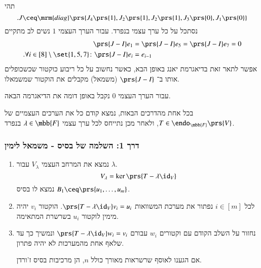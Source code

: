 \documentclass[a4paper,10pt,oneside,openany]{article}
\newcommand{\heart}{\ensuremath\varheartsuit}
\begin{document}
\begin{example}
תהי
\[\text{.} J \ceq \mrm{diag}\prs{J_4\prs{1}, J_2\prs{1}, J_2\prs{1}, J_3\prs{0}, J_1\prs{0}}\]
נסתכל על כל ערך עצמי בנפרד.
עבור הערך העצמי
$1$
נשים לב מתקיים
\begin{align*}
\prs{J-I} e_1 &= \prs{J-I} e_5 = \prs{J-I} e_7 = 0 \\
\text{.} \forall i \in [8] \setminus \set{1,5,7}\colon \prs{J-I} e_i &= e_{i-1}
\end{align*}
אפשר לתאר זאת בדיאגרמת יאנג באופן הבא, כאשר נחשוב על כל ריבוע כוקטור שכשכופלים אותו ב־%
$\prs{J-I}$
(משמאל)
מקבלים את הוקטור שמשמאלו.
\begin{center}
\begin{english}
\end{english}
\end{center}

עבור הערך העצמי
$0$
נקבל באופן דומה את הדיאגרמה הבאה.
\begin{center}
\begin{english}
\end{english}
\end{center}
\end{example}

בכל אחת מהדרכים הבאות, נמצא קודם כל את הערכים העצמיים של
$T \in \endo_{\mbb{F}}\prs{V}$,
ולאחר מכן נתייחס לכל ערך עצמי
$\lambda \in \mbb{F}$
בנפרד.

\subsubsection{דרך 1: השלמה של בסיס - משמאל לימין}

\begin{enumerate}
\item נמצא את המרחב העצמי
$V_\lambda$
עבור
$\lambda$.
\[V_\lambda = \ker\prs{T-\lambda \id_V}\]
נמצא לו בסיס
$B_1 \ceq \prs{u_1, \ldots, u_m}$.

\item לכל
$i \in [m]$
נפתור את מערכת המשוואות
$\prs{T-\lambda \id_V} v_i = u_i$.
הוקטור
$v_i$
יהיה מימין לוקטור
$u_i$
בשרשרת המתאימה.


\item נחזור על השלב הקודם עם וקטורים
$w_i$
עבורם
$\prs{T-\lambda \id_V} w_i = v_i$
ונמשיך כך עד שלאף אחת מהמערכות לא יהיה פתרון.

אם הגענו לאוסף שרשראות מאורך כולל
$n$,
הן מרכיבות בסיס ז'ורדן.
\end{enumerate}
\end{document}
